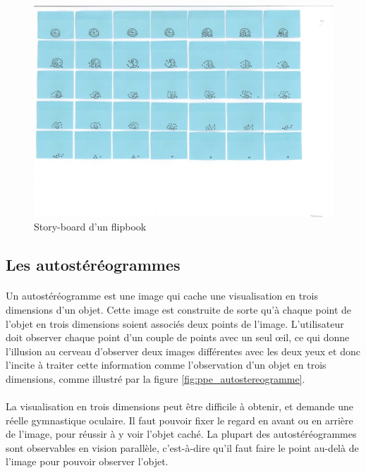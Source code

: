 \begin{figure}[h!]
		\centering
		\includegraphics[]{flipbook.png}
		\caption{\label{fig:flipbook} Story-board d’un flipbook \protect \footnotemark }
\end{figure}

\subsection{Les autostéréogrammes}	

\paragraph{}
	Un autostéréogramme est une image qui cache une visualisation en trois dimensions d’un objet. Cette image est construite de sorte qu'à chaque point de l'objet en trois dimensions soient associés deux points de l'image. L'utilisateur doit observer chaque point d'un couple de points avec un seul œil, ce qui donne l'illusion au cerveau d'observer deux images différentes avec les deux yeux et donc l'incite à traiter cette information comme l'observation d'un objet en trois dimensions, comme illustré par la figure \ref{fig:ppe_autostereogramme}.

\paragraph{}
	La visualisation en trois dimensions peut être difficile à obtenir, et demande une réelle gymnastique oculaire. Il faut pouvoir fixer le regard en avant ou en arrière de l’image, pour réussir à y voir l’objet caché. La plupart des autostéréogrammes sont observables en vision parallèle, c'est-à-dire qu'il faut faire le point au-delà de l'image pour pouvoir observer l'objet.

